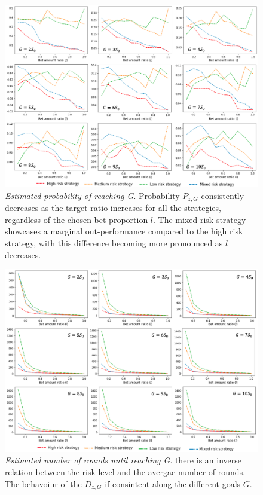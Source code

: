 \documentclass[11pt,twoside]{article}
\numberwithin{Theorem}{section}
\numberwithin{Definition}{section}
\numberwithin{Lemma}{section}
\numberwithin{Algorithm}{section}
\numberwithin{equation}{section}
\begin{document}
\begin{figure}[H]
        \centering
        \includegraphics[width=15cm]{proba_results.png}
        \caption[Fixed proportion of capital bet at a time exercise -  Probability of reaching G]{\textit{Estimated probability of reaching G}. Probability $P_{z,G}$ consistently decreases as the target ratio increases for all the strategies, regardless of the chosen bet proportion $l$. The mixed risk strategy showcases a marginal out-performance compared to the high risk strategy, with this difference becoming more pronounced as $l$ decreases. }\label{graf:proba}
\end{figure}
\begin{figure}[H]
        \centering
        \includegraphics[width=15cm]{results_rounds.png}
        \caption[Fixed proportion of capital bet at a time exercise - Number of rounds until reaching G]{\textit{Estimated number of rounds until reaching G}. there is an inverse relation between the risk level and the avergae number of rounds. The behavoiur of the $D_{z,G}$ if consintent along the different goals $G$. }\label{graf:round}
\end{figure}
\end{document}

